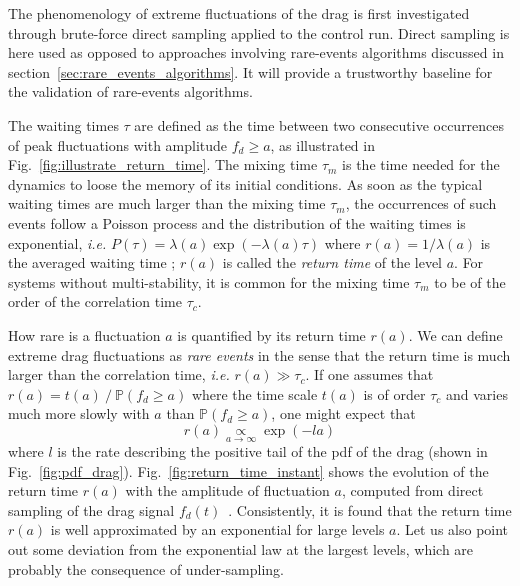 \documentclass[pre,aps,floatfix,10pt,superscriptaddress, notitlepage,preprint]{revtex4-1}
\begin{document}
%
The phenomenology of extreme fluctuations of the drag is first investigated through brute-force direct sampling applied to the control run.
Direct sampling is here used as opposed to approaches involving rare-events algorithms discussed in section~\ref{sec:rare_events_algorithms}.
It will provide a trustworthy baseline for the validation of rare-events algorithms. 

The waiting times $\tau$ are defined as the time between two consecutive occurrences of peak fluctuations with amplitude $f_d \geq a$, as illustrated in Fig.~\ref{fig:illustrate_return_time}.
The mixing time $\tau_m$ is the time needed for the dynamics to loose the memory of its initial conditions.
As soon as the typical waiting times are much larger than the mixing time $\tau_m$, the occurrences of such events follow a Poisson process and the distribution of the waiting times is exponential, \emph{i.e.} $P(\tau)=\lambda(a)\exp(-\lambda(a)\tau)$ where $r(a)=1/\lambda(a)$ is the averaged waiting time \cite{lestang_computing_2018}; $r(a)$ is called the {\it return time} of the level $a$.
For systems without multi-stability, it is common for the mixing time $\tau_m$ to be of the order of the correlation time $\tau_c$.

How rare is a fluctuation $a$ is quantified by its return time $r(a)$.
We can define extreme drag fluctuations as \textit{rare events} in the sense that the return time is much larger than the correlation time, \emph{i.e.} $r(a) \gg \tau_c$.
%
%
If one assumes that  $r(a) = t(a)~/~\mathbb{P}(f_d\geq a)$   where the time scale $t(a)$ is of order $\tau_c$ and varies much more slowly with $a$ than ${\mathbb{P}(f_d\geq a)}$,
one might expect that 
\begin{equation}
 \label{eq:return_time}
r(a) \underset{a\to\infty}{\propto} \exp(-la)
\end{equation}
where $l$ is the rate describing the positive tail of the \ac{pdf} of the drag (shown in Fig.~\ref{fig:pdf_drag}).
Fig.~\ref{fig:return_time_instant} shows the evolution of the return time $r(a)$ with the amplitude of fluctuation $a$, computed from {direct sampling} of the drag signal $f_d(t)$~\cite{lestang_computing_2018}.
Consistently, it is found that the return time $r(a)$ is well approximated by an exponential for large levels $a$. Let us also point out some deviation from the exponential law at the largest levels, which are probably the consequence of under-sampling.
\end{document}
